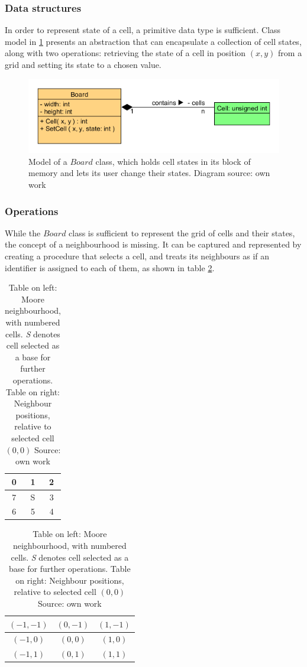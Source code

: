 \documentclass[12pt]{report}
\newcommand{\td}[1]{\todo[inline]{TO DO: #1}}
\begin{document}
\subsubsection{Data structures}
In order to represent state of a cell, a primitive data type is sufficient. Class model in \cref{fig:boardcell} presents an abstraction that can encapsulate a collection of cell states, along with two operations: retrieving the state of a cell in position $(x,y)$ from a grid and setting its state to a chosen value. 

\begin{figure}[h]
	\centering
	\includegraphics[width=0.8\linewidth]{diagrams/boardcell01}
	\caption{ Model of a $Board$ class, which holds cell states in its block of memory and lets its user change their states. Diagram source: own work} 
	\label{fig:boardcell}
\end{figure}

\td{code listing}

\subsubsection{Operations}
While the $Board$ class is sufficient to represent the grid of cells and their states, the concept of a neighbourhood is missing. It can be captured and represented by creating a procedure that selects a cell, and treats its neighbours as if an identifier is assigned to each of them, as shown in table \cref{tab:cellneighbors}. 

\begin{table}[h] 
	\centering 
	\begin{tabular}{| c | c | c |}\hline 
		0 & 1 & 2 \\ \hline
		7 & S & 3 \\ \hline
		6 & 5 & 4 \\ \hline
	\end{tabular} 
	\begin{tabular}{| c | c | c |}\hline 
		$(-1,-1)$ & $( 0,-1)$ & $( 1,-1)$ \\ \hline
		$(-1, 0)$ & $( 0, 0)$ & $( 1, 0)$ \\ \hline
		$(-1, 1)$ & $( 0, 1)$ & $( 1, 1)$ \\ \hline
	\end{tabular} 
	\caption{Table on left: Moore neighbourhood, with numbered cells. \textit{S} denotes cell selected as a base for further operations. Table on right: Neighbour positions, relative to selected cell $(0,0)$ Source: own work}
	\label{tab:cellneighbors}
\end{table}
\end{document}
